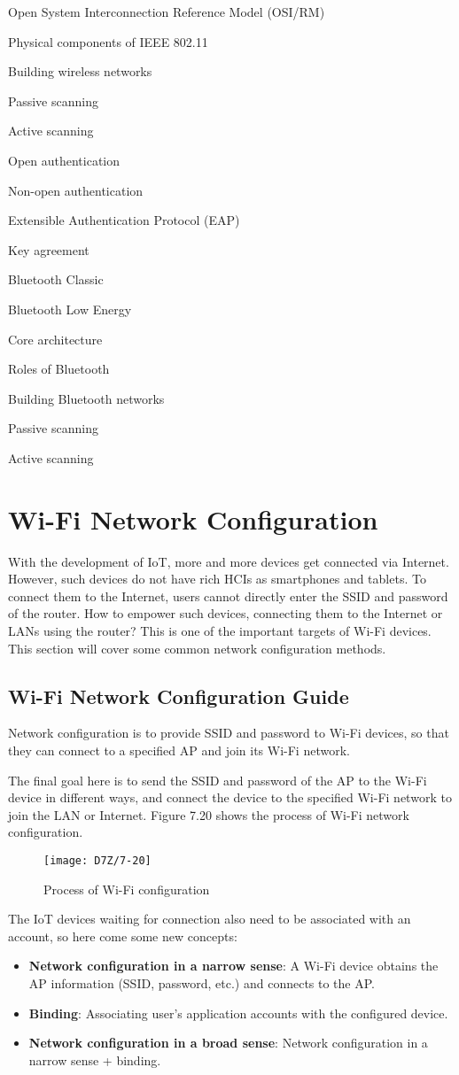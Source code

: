 \documentclass[a4paper,12pt]{book}
\begin{document}
\begin{term}{Open System Interconnection Reference Model (OSI/RM)}
\begin{term}{Physical components of IEEE 802.11}
\begin{term}{Building wireless networks}
\begin{term}{Passive scanning}
\begin{term}{Active scanning}
\begin{term}{Open authentication}
\begin{term}{Non-open authentication}
\begin{term}{Extensible Authentication Protocol (EAP)}
\begin{term}{Key agreement}
\begin{term}{Bluetooth Classic}
\begin{term}{Bluetooth Low Energy}
\begin{term}{Core architecture}
\begin{term}{Roles of Bluetooth}
\begin{term}{Building Bluetooth networks}
\begin{term}{Passive scanning}
\begin{term}{Active scanning}
\section{Wi-Fi Network Configuration}
With the development of IoT, more and more devices get connected via Internet. However, such devices do not have rich HCIs as smartphones and tablets. To connect them to the Internet, users cannot directly enter the SSID and password of the router. How to empower such devices, connecting them to the Internet or LANs using the router? This is one of the important targets of Wi-Fi devices. This section will cover some common network configuration methods.

\subsection{Wi-Fi Network Configuration Guide}
Network configuration is to provide SSID and password to Wi-Fi devices, so that they can connect to a specified AP and join its Wi-Fi network.

The final goal here is to send the SSID and password of the AP to the Wi-Fi device in different ways, and connect the device to the specified Wi-Fi network to join the LAN or Internet. Figure 7.20 shows the process of Wi-Fi network configuration.

\begin{figure}[!h]
    \centering
    \texttt{[image: D7Z/7-20]}
    \caption{Process of Wi-Fi configuration}
\end{figure}

The IoT devices waiting for connection also need to be associated with an account, so here come some new concepts:

\begin{itemize}[noitemsep]
    \item \textbf{Network configuration in a narrow sense}: A Wi-Fi device obtains the AP information (SSID, password, etc.) and connects to the AP.
    \item \textbf{Binding}: Associating user's application accounts with the configured device.
    \item \textbf{Network configuration in a broad sense}: Network configuration in a narrow sense + binding.
\end{itemize}


\end{term}
\end{term}
\end{term}
\end{term}
\end{term}
\end{term}
\end{term}
\end{term}
\end{term}
\end{term}
\end{term}
\end{term}
\end{term}
\end{term}
\end{term}
\end{term}
\end{document}
